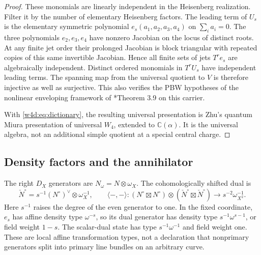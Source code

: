 \begin{proof}
These monomials are linearly independent in the Heisenberg realization. Filter it by the number of elementary Heisenberg factors. The leading term of $U_s$ is the elementary symmetric polynomial $e_s(a_1,a_2,a_3,a_4)$ on $\sum_i a_i=0$. The three polynomials $e_2,e_3,e_4$ have nonzero Jacobian on the locus of distinct roots. At any finite jet order their prolonged Jacobian is block triangular with repeated copies of this same invertible Jacobian. Hence all finite sets of jets $T^re_s$ are algebraically independent. Distinct ordered monomials in $T^rU_s$ have independent leading terms. The spanning map from the universal quotient to $V$ is therefore injective as well as surjective. This also verifies the PBW hypotheses of the nonlinear enveloping framework of \cite{wdr:DSK}*{Theorem 3.9} on this carrier.

With \eqref{w4d:eq:dictionary}, the resulting universal presentation is Zhu's quantum Miura presentation of universal $W_4$, extended to $\mathbb C(\alpha)$. It is the universal algebra, not an additional simple quotient at a special central charge.
\end{proof}

\subsection{Density factors and the annihilator}
The right $D_X$ generators are $N_\omega=N\otimes\omega_X$. The cohomologically shifted dual is
\[
 \check N^\circ=s^{-1}(N^\circ)^\vee\otimes\omega_X^{-1},
 \qquad
 \langle-,-\rangle:
 (N^\circ\boxtimes N^\circ)\otimes(\check N^\circ\boxtimes\check N^\circ)
 \longrightarrow s^{-2}\omega_{X^2}^{-1}.
\]
Here $s^{-1}$ raises the degree of the even generator to one. In the fixed coordinate, $e_s$ has affine density type $\omega^{-s}$, so its dual generator has density type $s^{-1}\omega^{s-1}$, or field weight $1-s$. The scalar-dual state has type $s^{-1}\omega^{-1}$ and field weight one. These are local affine transformation types, not a declaration that nonprimary generators split into primary line bundles on an arbitrary curve.

